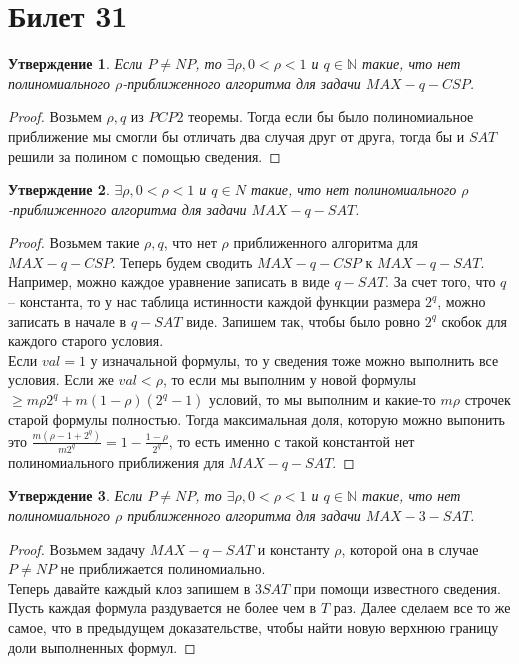 \documentclass[12pt, letterpaper]{article}
\newtheorem{prop}{Утверждение}[section]
\newcommand{\N}{\mathbb{N}}
\begin{document}
\section{Билет 31}

\begin{prop}
Если $P \neq NP$, то 
$\exists \rho, 0 < \rho < 1$ и $q \in \N$ такие, что нет полиномиального $\rho$-приближенного алгоритма для задачи $MAX-q-CSP$. 
\end{prop}
\begin{proof}
Возьмем $\rho, q$ из $PCP2$ теоремы. Тогда если бы было полиномиальное приближение мы смогли бы отличать два случая друг от друга, тогда бы и $SAT$ решили за полином с помощью сведения.
\end{proof}
\begin{prop}
$\exists \rho, 0 < \rho < 1$ и $q \in N$ такие, что нет полиномиального $\rho$-приближенного алгоритма для задачи $MAX-q-SAT$.
\end{prop}
\begin{proof}
Возьмем такие $\rho, q$, что нет $\rho$ приближенного алгоритма для $MAX-q-CSP$. Теперь будем сводить $MAX-q-CSP$ к $MAX-q-SAT$. Например, можно каждое уравнение записать в виде $q-SAT$. За счет того, что $q$ -- константа, то у нас таблица истинности каждой функции размера $2^q$, можно записать в начале в $q-SAT$ виде. Запишем так, чтобы было ровно $2^q$ скобок для каждого старого условия. \\
 Если $val=1$ у изначальной формулы, то у сведения тоже можно выполнить все условия. Если же $val < \rho$, то если мы выполним у новой формулы $\geq m\rho 2^q + m(1-\rho)(2^q-1)$ условий, то мы выполним и какие-то $m\rho$ строчек старой формулы полностью. Тогда максимальная доля, которую можно выпонить это $\frac{m(\rho-1+2^q)}{m2^q} = 1 - \frac{1-\rho}{2^q}$, то есть именно с такой константой нет полиномиального приближения для $MAX-q-SAT$.	
\end{proof}
\begin{prop}
Если $P \neq NP$, то $\exists \rho, 0 < \rho < 1$ и $q \in \N$ такие, что нет полиномиального $\rho$ приближенного алгоритма для задачи $MAX-3-SAT$.
\end{prop}
\begin{proof}
Возьмем задачу $MAX-q-SAT$ и константу $\rho$, которой она в случае $P \neq NP$ не приближается полиномиально. \\
Теперь давайте каждый клоз запишем в $3SAT$ при помощи известного сведения. Пусть каждая формула раздувается не более чем в $T$ раз. Далее сделаем все то же самое, что в предыдущем доказательстве, чтобы найти новую верхнюю границу доли выполненных формул.
\end{proof}
\end{document}
